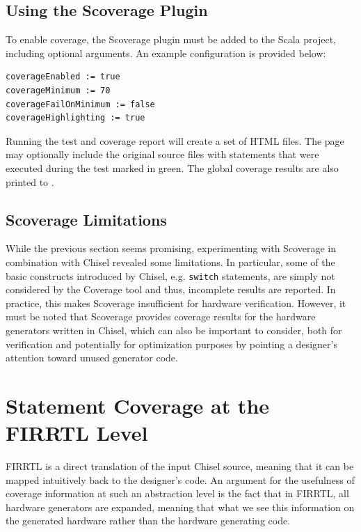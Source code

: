 \documentclass[runningheads]{llncs}
\begin{document}
\subsection{Using the Scoverage Plugin}
To enable coverage, the Scoverage plugin must be added to the Scala project, including optional arguments.
An example configuration is provided below:
\begin{verbatim}
coverageEnabled := true
coverageMinimum := 70
coverageFailOnMinimum := false
coverageHighlighting := true
\end{verbatim}
Running the test and coverage report will create a set of HTML files. The page may optionally include the original source files with statements that were executed during the test marked in green. The global coverage results are also printed to .

\subsection{Scoverage Limitations}
While the previous section seems promising, experimenting with Scoverage in combination with Chisel revealed some limitations. In particular, some of the basic constructs introduced by Chisel, e.g. \texttt{switch} statements, are simply not considered by the Coverage tool and thus, incomplete results are reported. In practice, this makes Scoverage insufficient for hardware verification. However, it must be noted that Scoverage provides coverage results for the hardware generators written in Chisel, which can also be important to consider, both for verification and potentially for optimization purposes by pointing a designer's attention toward unused generator code.

\section{Statement Coverage at the FIRRTL Level}  
FIRRTL is a direct translation of the input Chisel source, meaning that it can be mapped intuitively back to the designer's code. An argument for the usefulness of coverage information at such an abstraction level is the fact that in FIRRTL, all hardware generators are expanded, meaning that what we see this information on the generated hardware rather than the hardware generating code. 
\end{document}
